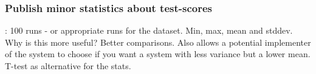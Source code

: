 \subsubsection{Publish minor statistics about test-scores}:
100 runs - or appropriate runs for the dataset. Min, max, mean and stddev. 
Why is this more useful? Better comparisons. Also allows a potential implementer of the system
to choose if you want a system with less variance but a lower mean. 
T-test as alternative for the stats. 
